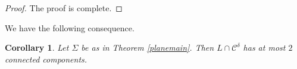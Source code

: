 \documentclass[11pt,a4paper,reqno]{amsart}
\newcommand{\R}{\mathbb{R}}
\newcommand{\calC}{\mathcal{C}}
\newcommand{\1}{\mathbf{1}}
\numberwithin{equation}{section}
\theoremstyle{plain}
\newtheorem{cor}[equation]{Corollary}
\theoremstyle{definition}
\theoremstyle{remark}
\begin{document}
\begin{proof}
%

  The proof is complete.
\end{proof}

We have the following consequence.

\begin{cor} \label{int2}
   Let $\Sigma$ be as in Theorem \ref{planemain}. Then $L \cap \calC^\delta$ has at most $2$ connected components.
\end{cor}
\end{document}
